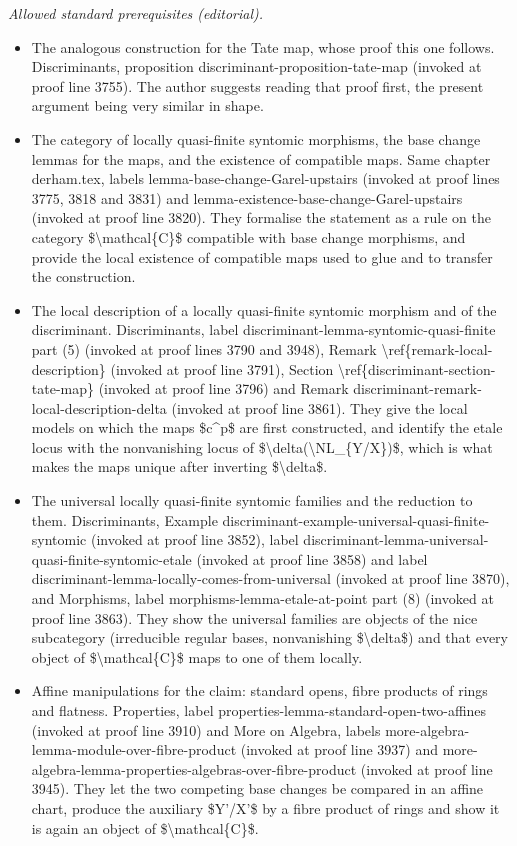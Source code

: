 \documentclass[10pt,a4paper]{amsart}
\theoremstyle{plain}
\theoremstyle{definition}
\theoremstyle{remark}
\numberwithin{equation}{subsection}
\begin{document}
\noindent\textit{Allowed standard prerequisites (editorial).}\begin{itemize}
\item The analogous construction for the Tate map, whose proof this one follows. Discriminants, proposition discriminant-proposition-tate-map (invoked at proof line 3755). The author suggests reading that proof first, the present argument being very similar in shape.
\item The category of locally quasi-finite syntomic morphisms, the base change lemmas for the maps, and the existence of compatible maps. Same chapter derham.tex, labels lemma-base-change-Garel-upstairs (invoked at proof lines 3775, 3818 and 3831) and lemma-existence-base-change-Garel-upstairs (invoked at proof line 3820). They formalise the statement as a rule on the category \$\textbackslash{}mathcal\{C\}\$ compatible with base change morphisms, and provide the local existence of compatible maps used to glue and to transfer the construction.
\item The local description of a locally quasi-finite syntomic morphism and of the discriminant. Discriminants, label discriminant-lemma-syntomic-quasi-finite part (5) (invoked at proof lines 3790 and 3948), Remark \textbackslash{}ref\{remark-local-description\} (invoked at proof line 3791), Section \textbackslash{}ref\{discriminant-section-tate-map\} (invoked at proof line 3796) and Remark discriminant-remark-local-description-delta (invoked at proof line 3861). They give the local models on which the maps \$c\textasciicircum{}p\$ are first constructed, and identify the etale locus with the nonvanishing locus of \$\textbackslash{}delta(\textbackslash{}NL\_\{Y/X\})\$, which is what makes the maps unique after inverting \$\textbackslash{}delta\$.
\item The universal locally quasi-finite syntomic families and the reduction to them. Discriminants, Example discriminant-example-universal-quasi-finite-syntomic (invoked at proof line 3852), label discriminant-lemma-universal-quasi-finite-syntomic-etale (invoked at proof line 3858) and label discriminant-lemma-locally-comes-from-universal (invoked at proof line 3870), and Morphisms, label morphisms-lemma-etale-at-point part (8) (invoked at proof line 3863). They show the universal families are objects of the nice subcategory (irreducible regular bases, nonvanishing \$\textbackslash{}delta\$) and that every object of \$\textbackslash{}mathcal\{C\}\$ maps to one of them locally.
\item Affine manipulations for the claim: standard opens, fibre products of rings and flatness. Properties, label properties-lemma-standard-open-two-affines (invoked at proof line 3910) and More on Algebra, labels more-algebra-lemma-module-over-fibre-product (invoked at proof line 3937) and more-algebra-lemma-properties-algebras-over-fibre-product (invoked at proof line 3945). They let the two competing base changes be compared in an affine chart, produce the auxiliary \$Y'/X'\$ by a fibre product of rings and show it is again an object of \$\textbackslash{}mathcal\{C\}\$.
\end{itemize}\medskip
\end{document}
